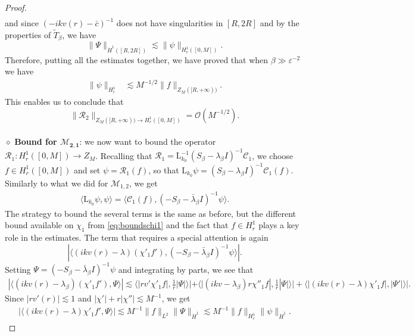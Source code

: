\documentclass[11pt,reqno]{amsproc}
\def\eps{\varepsilon}
\def\HH {\dot{H}^1}
\newcommand{\rmL}{\mathrm{L}}
\newcommand{\cM}{\mathcal{M}}
\newcommand{\cR}{\mathcal{R}}
\newcommand{\cO}{\mathcal{O}}
\theoremstyle{definition}
\theoremstyle{definition}
\numberwithin{equation}{section}
\begin{document}
\begin{proof}
\begin{align}
\end{align}
and since $(-ikv(r)-\bar c)^{-1}$ does not have singularities in $[R,2R]$ and by the properties of $\tilde T_\beta$, we have
\begin{equation}
\label{eq:psiPsi}
    \| \Psi\|_{\HH([R,2R])} \lesssim \|\psi\|_{H^1_r([0,M])}.
\end{equation}
Therefore, putting all the estimates together, we have proved that when $\beta\gg \eps^{-2}$ we have
\begin{align}
\|\psi\|_{H^1_r} & \lesssim M^{-1/2} \| f\|_{Z_M([R, +\infty))} .
\end{align}
This enables us to conclude that
\begin{equation}
\|\mathcal R_2\|_{Z_M([R, +\infty)) \rightarrow H^1_r([0, M])} = \cO(M^{-1/2}).
\end{equation}
\\
\noindent $\diamond$ \textbf{Bound for $\mathbf{\cM_{2,1}}$}: we now want to bound the operator $\cR_1: H^1_r([0,M]) \to Z_M$. 
Recalling that $\cR_1 = \rmL_{k_0}^{-1}(S_\beta-\lambda_\beta I)^{-1}\mathcal{C}_1$, we choose $f \in H^1_r([0,M]) $ and set $\psi = \cR_1(f)$, so that 
$\rmL_{k_0} \psi = (S_\beta-\lambda_\beta I)^{-1}\mathcal{C}_1(f)$. Similarly to what we did for $\cM_{1,2}$, we get
\begin{align}
\label{eq:M21}
    \langle \rmL_{k_0} \psi, \psi \rangle = \langle \mathcal{C}_1(f) , (-S_\beta-\bar \lambda_\beta I)^{-1} \psi \rangle.
\end{align}
The strategy to bound the several terms is the same as before, but the different bound available on $\chi_1$ from \cref{eq:boundschi1} and the fact that $f\in H^1_r$ plays a key role in the estimates.
The term that requires a special attention is again 
\begin{equation}
    |\langle (ikv(r) - \lambda) (\chi'_1 f'), (-S_\beta-\bar \lambda_\beta I)^{-1}  \psi\rangle|.
\end{equation}
Setting $\Psi = (-S_\beta-\bar \lambda_\beta I)^{-1}  \psi$ and integrating by parts, we see that
\begin{align}
    |\langle (ikv(r) - \lambda_\beta) (\chi'_1 f'), \Psi\rangle|\lesssim \langle |rv' \chi'_1 f|, \frac{1}{r}|\Psi| \rangle|+\langle |(ikv-\lambda_\beta) r\chi''_1 f|, \frac{1}{r}|\Psi| \rangle|+\langle |(ikv(r)-\lambda)\chi'_1 f|, |\Psi '| \rangle|.
\end{align}
Since $|rv'(r)|\lesssim 1$ and $|\chi'|+r|\chi''|\lesssim M^{-1}$, we get
\begin{align}
|\langle (ikv(r) - \lambda)\chi'_1 f', \Psi \rangle | \lesssim   M^{-1} \|f\|_{L^2} \| \Psi\|_{\dot{H}^1}\lesssim M^{-1} \|f\|_{H^1_r} \|\psi\|_{\dot{H}^1}.

\end{align}
\end{proof}
\end{document}
